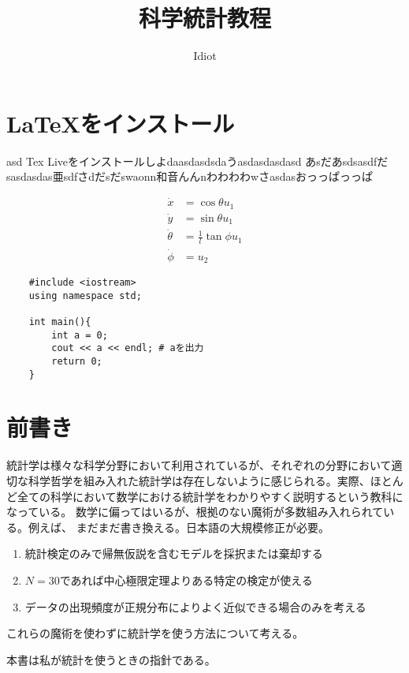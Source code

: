 \documentclass[a4paper,11pt,dvipdfmx]{jsarticle}
\begin{document}
\title{科学統計教程}
\author{Idiot}
\maketitle

\section{ \LaTeX をインストール}asd
Tex Liveをインストールしよdaasdasdsdaうasdasdasdasd
あsだあsdsasdfだsasdasdas亜sdfさdだsだswaonn和音んんnわわわわwさasdasおっっぱっっぱ

\begin{align*}
    \dot{x}      & = \cos \theta u_1          \\
    \dot{y}      & = \sin \theta u_1          \\
    \dot{\theta} & = \frac{1}{l}\tan \phi u_1 \\
    \dot{\phi}   & = u_2
\end{align*}

\begin{lstlisting}
    #include <iostream>
    using namespace std;
    
    int main(){
        int a = 0;
        cout << a << endl; # aを出力
        return 0;
    }
\end{lstlisting}
\fi 
\section{前書き}
統計学は様々な科学分野において利用されているが、それぞれの分野において適切な科学哲学を組み入れた統計学は存在しないように感じられる。実際、ほとんど全ての科学において数学における統計学をわかりやすく説明するという教科になっている。
数学に偏ってはいるが、根拠のない魔術が多数組み入れられている。例えば、
\fi
まだまだ書き換える。日本語の大規模修正が必要。

\begin{enumerate}
    \item 統計検定のみで帰無仮説を含むモデルを採択または棄却する
    \item $N=30$であれば中心極限定理よりある特定の検定が使える
    \item データの出現頻度が正規分布によりよく近似できる場合のみを考える
\end{enumerate}
これらの魔術を使わずに統計学を使う方法について考える。

本書は私が統計を使うときの指針である。
\end{document}
